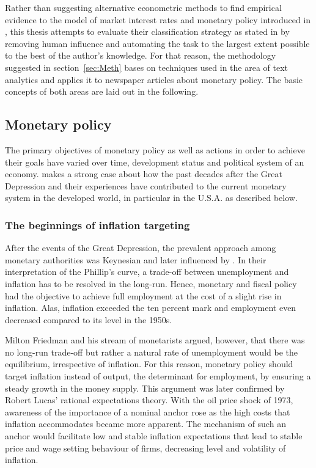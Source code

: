 
Rather than suggesting alternative econometric methods to find empirical evidence to the model of market interest rates and monetary policy introduced in \textcite{Ellingsen.2001}, this thesis attempts to evaluate their classification strategy as stated in \textcite{Ellingsen.2003} by removing human influence and automating the task to the largest extent possible to the best of the author's knowledge. For that reason, the methodology suggested in section~\ref{sec:Meth} bases on techniques used in the area of text analytics and applies it to newspaper articles about monetary policy. The basic concepts of both areas are laid out in the following.

\subsection{Monetary policy}

The primary objectives of monetary policy as well as actions in order to achieve their goals have varied over time, development status and  political system of an economy. \textcite{Mishkin.2007} makes a strong case about how the past decades after the Great Depression and their experiences have contributed to the current monetary system in the developed world, in particular in the U.S.A. as described below. 

\subsubsection{The beginnings of inflation targeting}
After the events of the Great Depression, the prevalent approach among monetary authorities was Keynesian and later influenced by \textcite{Samuelson.1960}. In their interpretation of the Phillip's curve, a trade-off between unemployment and inflation has to be resolved in the long-run. Hence, monetary and fiscal policy had the objective to achieve full employment at the cost of a slight rise in inflation. Alas, inflation exceeded the ten percent mark and employment even decreased compared to its level in the 1950s. 

Milton Friedman and his stream of monetarists argued, however, that there was no long-run trade-off but rather a natural rate of unemployment would be the equilibrium, irrespective of inflation. For this reason, monetary policy should target inflation instead of output, the determinant for employment, by ensuring a steady growth in the money supply. This argument was later confirmed by Robert Lucas' rational expectations theory. With the oil price shock of 1973, awareness of the importance of a nominal anchor rose as the high costs that inflation accommodates became more apparent. The mechanism of such an anchor would facilitate low and stable inflation expectations that lead to stable price and wage setting behaviour of firms, decreasing level and volatility of inflation.

